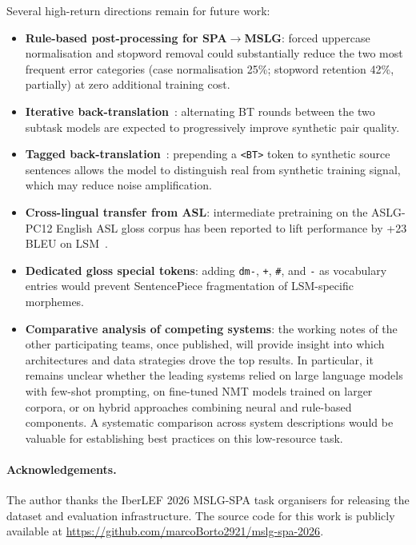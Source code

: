 \documentclass[sigconf,screen]{ceurart}
\begin{document}
Several high-return directions remain for future work:
\begin{itemize}
  \item \textbf{Rule-based post-processing for SPA$\!\to\!$MSLG}:
        forced uppercase normalisation and stopword removal could
        substantially reduce the two most frequent error categories
        (case normalisation 25\%; stopword retention 42\%, partially)
        at zero additional training cost.
  \item \textbf{Iterative back-translation}~\cite{hoang2018iterative}:
        alternating BT rounds between the two subtask models are
        expected to progressively improve synthetic pair quality.
  \item \textbf{Tagged back-translation}~\cite{caswell2019tagged}:
        prepending a \texttt{<BT>} token to synthetic source sentences
        allows the model to distinguish real from synthetic training
        signal, which may reduce noise amplification.
  \item \textbf{Cross-lingual transfer from ASL}: intermediate
        pretraining on the ASLG-PC12 English ASL gloss corpus has
        been reported to lift performance by +23 BLEU on
        LSM~\cite{rodriguez2026overview}.
  \item \textbf{Dedicated gloss special tokens}: adding \texttt{dm-},
        \texttt{+}, \texttt{\#}, and \texttt{-} as vocabulary entries
        would prevent SentencePiece fragmentation of LSM-specific
        morphemes.
  \item \textbf{Comparative analysis of competing systems}: the working
        notes of the other participating teams, once published, will
        provide insight into which architectures and data strategies
        drove the top results. In particular, it remains unclear
        whether the leading systems relied on large language models
        with few-shot prompting, on fine-tuned NMT models trained on
        larger corpora, or on hybrid approaches combining neural and
        rule-based components. A systematic comparison across system
        descriptions would be valuable for establishing best practices
        on this low-resource task.
\end{itemize}

\paragraph{Acknowledgements.}
The author thanks the IberLEF 2026 MSLG-SPA task organisers for
releasing the dataset and evaluation infrastructure.
The source code for this work is publicly available at
\url{https://github.com/marcoBorto2921/mslg-spa-2026}.
\end{document}
